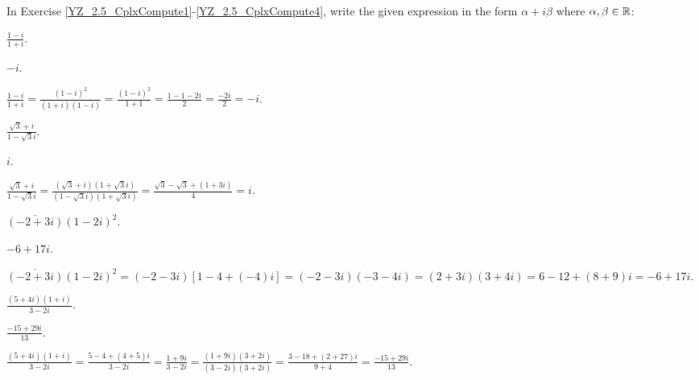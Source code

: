 \documentclass{ximera}
\begin{document}
In Exercise \ref{YZ_2.5_CplxCompute1}-\ref{YZ_2.5_CplxCompute4}, write the given expression 
in the form $\alpha + i\beta$ where $\alpha,\beta\in\mbox{$\mathbb{R}$}$:

\begin{exercise} \label{YZ_2.5_CplxCompute1}
$\frac{1-i}{1+i}$.

\begin{solution}
\ans $-i$.

\soln $\frac{1-i}{1+i}=\frac{(1-i)^2}{(1+i)(1-i)}=\frac{(1-i)^2}{1+1}=\frac{1-1-2i}{2}=\frac{-2i}{2}=-i$.
\end{solution}
\end{exercise}


\begin{exercise}\label{YZ_2.5_CplxCompute2}
$\frac{\sqrt{3}+i}{1-\sqrt{3}i}$.

\begin{solution}
\ans $i$.

\soln $\frac{\sqrt{3}+i}{1-\sqrt{3}i}=\frac{(\sqrt{3}+i)(1+\sqrt{3}i)}{(1-\sqrt{3}i)(1+\sqrt{3}i)}=\frac{\sqrt{3}-\sqrt{3}+(1+3i)}{4}=i$.
\end{solution}
\end{exercise}

\begin{exercise}\label{YZ_2.5_CplxCompute3}
$\overline{(-2+3i)}(1-2i)^2$.

\begin{solution}
\ans $-6+17i$.

\soln $\overline{(-2+3i)}(1-2i)^2=(-2-3i)[1-4+(-4)i]=(-2-3i)(-3-4i)=(2+3i)(3+4i)=6-12+(8+9)i=-6+17i$.
\end{solution}
\end{exercise}

\begin{exercise}\label{YZ_2.5_CplxCompute4}
$\frac{(5+4i)(1+i)}{3-2i}$.

\begin{solution}
\ans $\frac{-15+29i}{13}$.

\soln $\frac{(5+4i)(1+i)}{3-2i}=\frac{5-4+(4+5)i}{3-2i}=\frac{1+9i}{3-2i}=\frac{(1+9i)(3+2i)}{(3-2i)(3+2i)}=\frac{3-18+(2+27)i}{9+4}=\frac{-15+29i}{13}$.
\end{solution}
\end{exercise}
\end{document}
